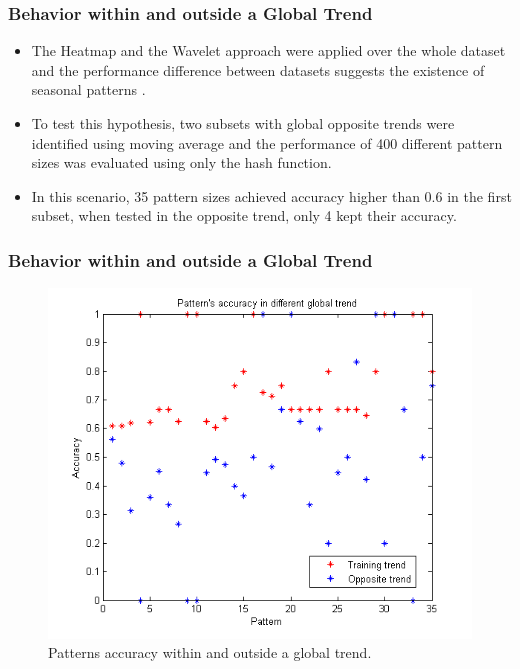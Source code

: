 \documentclass{beamer}
\begin{document}
\begin{frame}
\frametitle{Behavior within and outside a Global Trend}

\begin{itemize}
	\item \small The Heatmap and the Wavelet approach were applied over the whole dataset and the performance difference between datasets suggests the existence of seasonal patterns \cite{Jian09a}.
	\item \small To test this hypothesis, two subsets with global opposite trends were identified using moving average and the performance of 400 different pattern sizes was evaluated using only the hash function. 
	\item \small In this scenario, 35 pattern sizes achieved accuracy higher than 0.6 in the first subset, when tested in the opposite trend, only 4 kept their accuracy.
\end{itemize}

\end{frame}


\begin{frame}
\frametitle{Behavior within and outside a Global Trend}
\begin{figure}
		\centering
			\includegraphics[scale=0.3]{GlobalTrend.png}
		\caption{Patterns accuracy within and outside a global trend.}
		\label{fig:globalTrend}
	\end{figure}
\end{frame}
\end{document}
